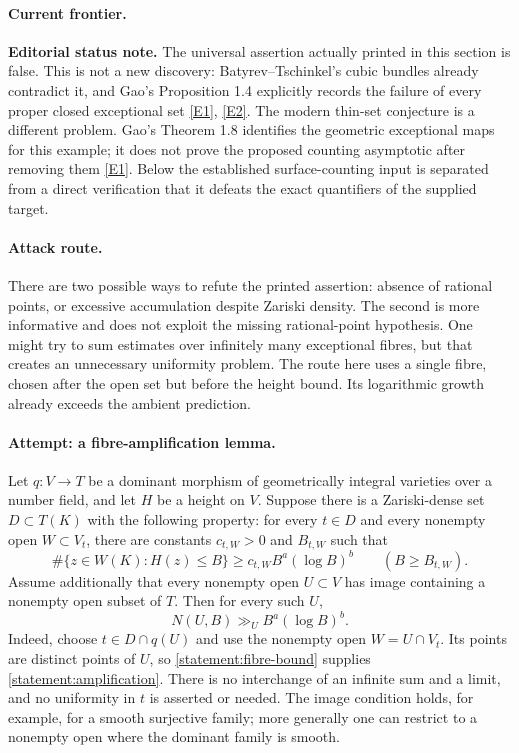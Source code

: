 \documentclass[11pt,a4paper]{article}
\newcommand{\eref}[2]{\hyperlink{extra:#1:#2}{[E#2]}}
\numberwithin{equation}{section}
\begin{document}
\paragraph{Current frontier.}
\textbf{Editorial status note.} The universal assertion actually printed in
this section is false. This is not a new discovery: Batyrev--Tschinkel's
cubic bundles already contradict it, and Gao's Proposition 1.4 explicitly
records the failure of every proper closed exceptional set
\eref{statement}{1}, \eref{statement}{2}. The modern thin-set conjecture is a different
problem. Gao's Theorem 1.8 identifies the geometric exceptional maps for
this example; it does not prove the proposed counting asymptotic after
removing them \eref{statement}{1}. Below the established surface-counting input
is separated from a direct verification that it defeats the exact
quantifiers of the supplied target.

\paragraph{Attack route.}
There are two possible ways to refute the printed assertion: absence of
rational points, or excessive accumulation despite Zariski density. The
second is more informative and does not exploit the missing rational-point
hypothesis. One might try to sum estimates over infinitely many exceptional
fibres, but that creates an unnecessary uniformity problem. The route here
uses a single fibre, chosen after the open set but before the height bound.
Its logarithmic growth already exceeds the ambient prediction.

\paragraph{Attempt: a fibre-amplification lemma.}
Let $q:V\to T$ be a dominant morphism of geometrically integral varieties
over a number field, and let $H$ be a height on $V$. Suppose there is a
Zariski-dense set $D\subset T(K)$ with the following property: for every
$t\in D$ and every nonempty open $W\subset V_t$, there are constants
$c_{t,W}>0$ and $B_{t,W}$ such that
\begin{equation}\label{statement:fibre-bound}
 \#\{z\in W(K):H(z)\le B\}\ge c_{t,W}B^a(\log B)^b
 \qquad(B\ge B_{t,W}).
\end{equation}
Assume additionally that every nonempty open $U\subset V$ has image
containing a nonempty open subset of $T$. Then for every such $U$,
\begin{equation}\label{statement:amplification}
 N(U,B)\gg_U B^a(\log B)^b.
\end{equation}
Indeed, choose $t\in D\cap q(U)$ and use the nonempty open
$W=U\cap V_t$. Its points are distinct points of $U$, so
\eqref{statement:fibre-bound} supplies \eqref{statement:amplification}. There is no
interchange of an infinite sum and a limit, and no uniformity in $t$ is
asserted or needed. The image condition holds, for example, for a smooth
surjective family; more generally one can restrict to a nonempty open
where the dominant family is smooth.
\end{document}
